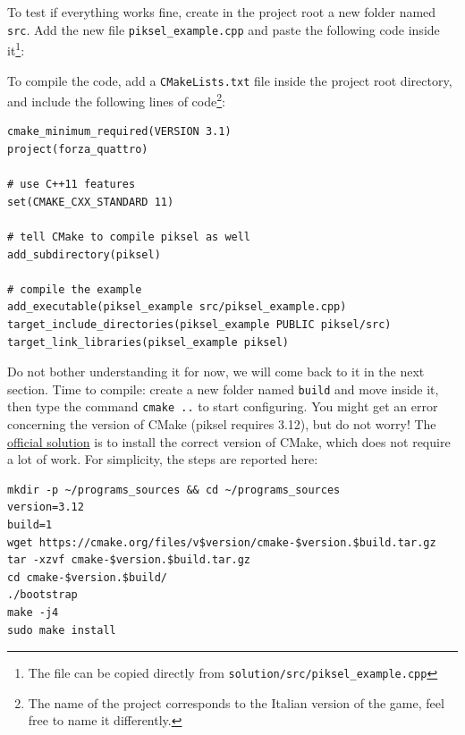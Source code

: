 \documentclass{article}
\begin{document}
To test if everything works fine, create in the project root a new folder named \texttt{src}. Add the new file \texttt{piksel\string_example.cpp} and paste the following code inside it\footnote{The file can be copied directly from \texttt{solution/src/piksel\string_example.cpp}}:




To compile the code, add a \texttt{CMakeLists.txt} file inside the project root directory, and include the following lines of code\footnote{The name of the project corresponds to the Italian version of the game, feel free to name it differently.}:

\begin{lstlisting}[style=mycmake]
cmake_minimum_required(VERSION 3.1)
project(forza_quattro)

# use C++11 features
set(CMAKE_CXX_STANDARD 11)

# tell CMake to compile piksel as well
add_subdirectory(piksel)

# compile the example
add_executable(piksel_example src/piksel_example.cpp)
target_include_directories(piksel_example PUBLIC piksel/src)
target_link_libraries(piksel_example piksel)
\end{lstlisting}

Do not bother understanding it for now, we will come back to it in the next section. Time to compile: create a new folder named \texttt{build} and move inside it, then type the command \texttt{cmake~..} to start configuring. You might get an error concerning the version of CMake (piksel requires 3.12), but do not worry! The \href{https://bernhardfritz.github.io/piksel/#/gettingstarted/troubleshooting}{official solution} is to install the correct version of CMake, which does not require a lot of work. For simplicity, the steps are reported here:

\begin{center}
\begin{minipage}{.9\textwidth}
\begin{lstlisting}[style=myterm]
mkdir -p ~/programs_sources && cd ~/programs_sources
version=3.12
build=1
wget https://cmake.org/files/v$version/cmake-$version.$build.tar.gz
tar -xzvf cmake-$version.$build.tar.gz
cd cmake-$version.$build/
./bootstrap
make -j4
sudo make install
\end{lstlisting}
\end{minipage}
\end{center}
\end{document}

